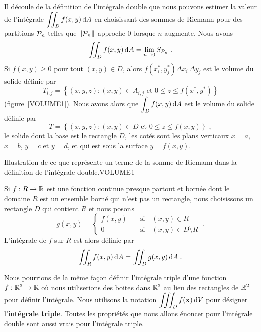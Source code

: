 {Il découle de la définition de l'intégrale double que nous pouvons
estimer la valeur de l'intégrale
$\displaystyle \iint_D f(x,y) \,\mathrm{d}A$ en choisissant
des sommes de Riemann pour des partitions ${\cal P}_n$ telles que
$\|{\cal P}_n\|$ approche $0$ lorsque $n$ augmente.  Nous avons
\begin{equation}\label{defDI_int_cpm}
\iint_D f(x,y) \,\mathrm{d}A = \lim_{n\rightarrow 0}  S_{{\cal P}_n} \; .
\end{equation}
Si $f(x,y) \geq 0$ pour tout $(x,y) \in D$, alors
$f\left(x_i^\ast,y_j^\ast\right) \Delta x_i \, \Delta y_j$ est
le volume du solide définie par
\[
T_{i,j} = \left\{ (x,y,z) : (x,y) \in A_{i,j} \text{ et }
0 \leq z \leq f(x^\ast,y^\ast) \right\}
\]
(figure~\ref{VOLUME1}).
Nous avons alors que $\displaystyle \int_D f(x,y) \,\mathrm{d}A$ est le volume du
solide définie par
\[
T = \left\{ (x,y,z) : (x,y) \in D \text{ et } 0 \leq z \leq f(x,y)
\right\} \; ,
\]
le solide dont la base est le rectangle $D$, les cotés sont les plans
verticaux $x=a$, $x=b$, $y=c$ et $y=d$, et qui est sous la surface
$y=f(x,y)$.

 {Illustration
de ce que représente un terme de la somme de Riemann dans la définition de
l'intégrale double.}{VOLUME1}

\begin{focus}{\dfn}
Si $f:R\rightarrow \mathbb{R}$ est une fonction continue presque partout et
bornée dont le domaine $R$ est un ensemble borné qui n'est pas un
rectangle, nous choisissons un rectangle $D$ qui contient $R$ et nous
posons
\[
g(x,y) = \begin{cases} f(x,y) & \quad \text{si} \quad (x,y) \in R \\
0 & \quad \text{si} \quad (x,y) \in D\setminus R
\end{cases} \; .
\]
L'intégrale de $f$ sur $R$ est alors définie par
\[
\iint_R f(x,y) \,\mathrm{d}A = \iint_D g(x,y) \,\mathrm{d}A \; .
\]
\end{focus}

Nous pourrions de la même façon définir l'intégrale triple d'une fonction
$f:\mathbb{R}^3 \to \mathbb{R}$ où nous utiliserions des boites dans $\mathbb{R}^3$ au lieu
des rectangles de $\mathbb{R}^2$ pour définir l'intégrale.  Nous utilisons la
notation $\displaystyle \iiint_D f(\mathbf{x}) \,\mathrm{d}V$ pour
désigner l'{\bfseries intégrale triple}.
Toutes les propriétés que nous allons énoncer pour l'intégrale double
sont aussi vrais pour l'intégrale triple.

}
